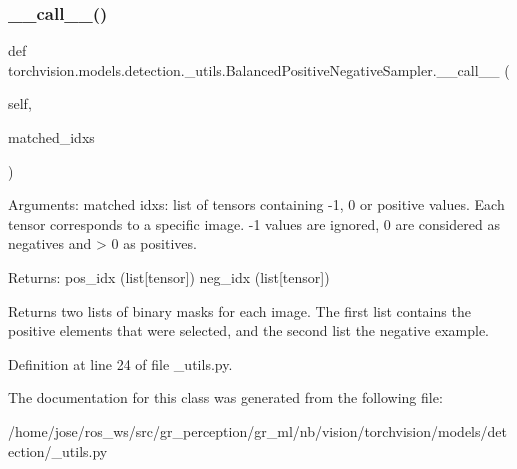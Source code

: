\subsubsection{\texorpdfstring{\+\_\+\+\_\+call\+\_\+\+\_\+()}{\_\_call\_\_()}}
{\footnotesize\ttfamily def torchvision.\+models.\+detection.\+\_\+utils.\+Balanced\+Positive\+Negative\+Sampler.\+\_\+\+\_\+call\+\_\+\+\_\+ (\begin{DoxyParamCaption}\item[{}]{self,  }\item[{}]{matched\+\_\+idxs }\end{DoxyParamCaption})}

\begin{DoxyVerb}Arguments:
    matched idxs: list of tensors containing -1, 0 or positive values.
Each tensor corresponds to a specific image.
-1 values are ignored, 0 are considered as negatives and > 0 as
positives.

Returns:
    pos_idx (list[tensor])
    neg_idx (list[tensor])

Returns two lists of binary masks for each image.
The first list contains the positive elements that were selected,
and the second list the negative example.
\end{DoxyVerb}
 

Definition at line 24 of file \+\_\+utils.\+py.



The documentation for this class was generated from the following file\+:\begin{DoxyCompactItemize}
\item 
/home/jose/ros\+\_\+ws/src/gr\+\_\+perception/gr\+\_\+ml/nb/vision/torchvision/models/detection/\+\_\+utils.\+py\end{DoxyCompactItemize}
